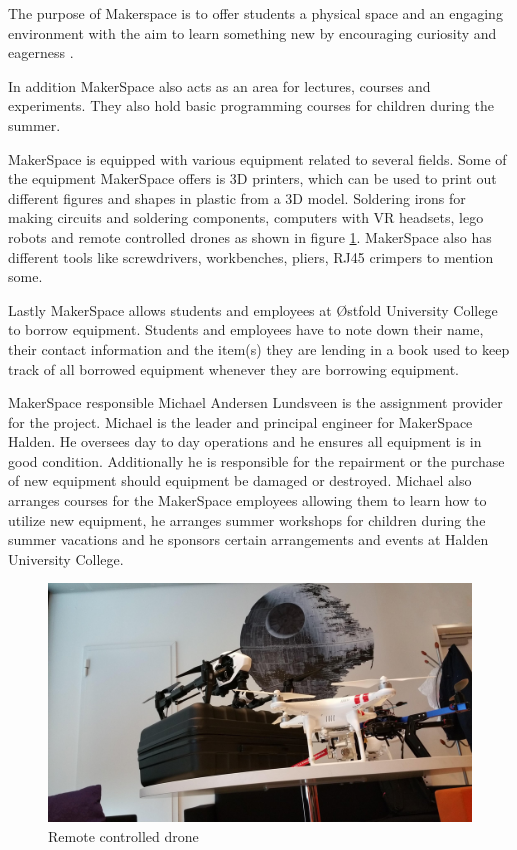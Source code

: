\begin{displayquote}
The purpose of Makerspace is to offer students a physical space and an engaging environment with the aim to learn something new by encouraging curiosity and eagerness \cite{what-is-makerspace}.
\end{displayquote}
In addition MakerSpace also acts as an area for lectures, courses and experiments.
They also hold basic programming courses for children during the summer.

MakerSpace is equipped with various equipment related to several fields.
Some of the equipment MakerSpace offers is 3D printers, which can be used to print out different figures and shapes in plastic from a 3D model. Soldering irons for making circuits and soldering components, computers with VR headsets, lego robots and remote controlled drones as shown in figure \ref{fig:makerspace}. MakerSpace also has different tools like screwdrivers, workbenches, pliers, RJ45 crimpers to mention some.

Lastly MakerSpace allows students and employees at Østfold University College to borrow equipment.
Students and employees have to note down their name, their contact information and the item(s) they are lending in a book used to keep track of all borrowed equipment whenever they are borrowing equipment.

MakerSpace responsible Michael Andersen Lundsveen is the assignment provider for the project. 
Michael is the leader and principal engineer for MakerSpace Halden.
He oversees day to day operations and he ensures all equipment is in good condition.
Additionally he is responsible for the repairment or the purchase of new equipment should equipment be damaged or destroyed.
Michael also arranges courses for the MakerSpace employees allowing them to learn how to utilize new equipment, he arranges summer workshops for children during the summer vacations and he sponsors certain arrangements and events at Halden University College.

\begin{figure}
    \centering
    \includegraphics[width=115mm,scale=1]{images/makerspace.png}
    \caption{Remote controlled drone}
    \label{fig:makerspace}
\end{figure}


